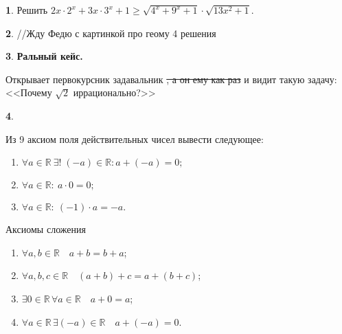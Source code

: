 \documentclass[14pt, a4paper]{extarticle}
\theoremstyle{definition}
\newtheorem{problem}{}
\theoremstyle{definition}
\theoremstyle{remark}
\numberwithin{equation}{section}
\newcommand{\R}{\ensuremath{\mathbb{R}}}
\begin{document}
\begin{problem}
    Решить $2x \cdot 2^x + 3x \cdot 3^x + 1 \geqslant 
    \sqrt{4^x + 9^x +1} \cdot \sqrt{13x^2 + 1}.$
\end{problem}

\begin{problem}
    //Жду Федю с картинкой про геому 4 решения
\end{problem}

\begin{problem}
    \textbf{Ральный кейс.}

    Открывает первокурсник задавальник \sout{, а он ему как раз}
    и видит такую задачу: <<Почему $\sqrt{2}$ иррационально?>>
\end{problem}

\begin{problem}
    \begin{multicols*}{2}
        Из 9 аксиом поля действительных чисел вывести следующее:
        {
            \renewcommand{\labelenumi}{\alph{enumi})}
            \singlespacing

            \begin{enumerate}
            \item $\forall a \in \R \ \exists ! \; (-a)\in \R : a + (-a) = 0;$
            
            \item $\forall a \in \R : \ a \cdot 0 = 0;$
            
            \item $\forall a \in \R : \ (-1) \cdot a = -a.$
            \end{enumerate}
        }

        \columnbreak

        {
            \renewcommand{\labelenumi}{\theenumi)}
            \singlespacing

            Аксиомы сложения
            \begin{enumerate}
                \item $\forall a, b \in \R \quad a + b = b + a$;
                \item $\forall a, b, c \in \R \quad (a + b) + c = a + (b + c)$;
                \item $\exists 0 \in \R \, \forall a \in \R \quad a + 0 = a$;
                \item $\forall a \in \R \, \exists (-a) \in \R \quad a + (-a) = 0$.

                \setcounter{axiomscounter}{\theenumi}
            \end{enumerate}

}
\end{multicols*}
\end{problem}
\end{document}
